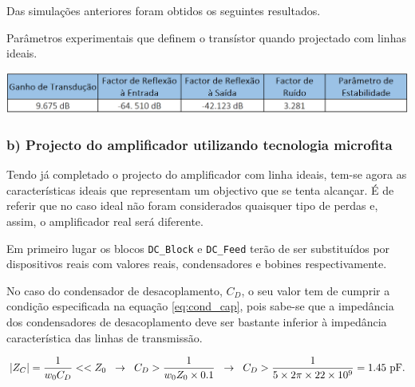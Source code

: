 \documentclass[11pt]{article}
\numberwithin{equation}{section}
\begin{document}
Das simulações anteriores foram obtidos os seguintes resultados.

\begin{table}[H]
	\centering
	\caption{Parâmetros experimentais que definem o transístor quando projectado com linhas ideais.}
	\vspace{-1.5mm}
	\includegraphics[keepaspectratio=true, scale=0.45]{exps/pergunta4}
\end{table}





\subsubsection{b) Projecto do amplificador utilizando tecnologia microfita}

Tendo já completado o projecto do amplificador com linha ideais, tem-se agora as características ideais que representam um objectivo que se tenta alcançar. É de referir que no caso ideal não foram considerados quaisquer tipo de perdas e, assim, o amplificador real será diferente.

Em primeiro lugar os blocos \texttt{DC\_Block} e \texttt{DC\_Feed} terão de ser substituídos por dispositivos reais com valores reais, condensadores e bobines respectivamente. 

No caso do condensador de desacoplamento, $C_{D}$, o seu valor tem de cumprir a condição especificada na equação \ref{eq:cond_cap}, pois sabe-se que a impedância dos condensadores de desacoplamento deve ser bastante inferior à impedância característica das linhas de transmissão. 

\vspace{-3mm}
\begin{equation}
\lvert Z_C \rvert = \frac{1}{w_{0} C_{D}} << Z_0 \hspace{2mm} \rightarrow \hspace{2mm} C_{D} > \frac{1}{w_{0}Z_0 \times 0.1} \hspace{2mm} \rightarrow \hspace{2mm} C_{D} > \dfrac{1}{5 \times 2 \pi \times 22 \times 10^{9}} = 1.45~\text{pF}.
\label{eq:cond_cap}
\end{equation}
\end{document}
